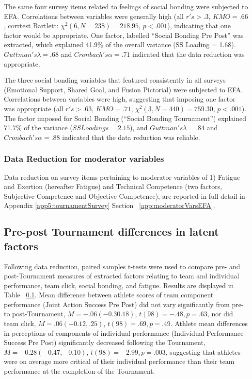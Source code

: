 The same four survey items related to feelings of social bonding were subjected to EFA. Correlations between variables were generally high (all $r's > .3$, $KMO = .66$, corrtest Bartlett: $\chi^2(6, N = 238) = 218.95$, $p < .001$), indicating that one factor would be appropriate.  One factor, labelled ``Social Bonding Pre Post'' was extracted, which explained 41.9\% of the overall variance (SS Loading = 1.68).  $Guttman's \lambda =.68$ and $Cronbach's \alpha = .71$ indicated that the data reduction was appropriate.

The three social bonding variables that featured consistently in all surveys (Emotional Support, Shared Goal, and Fusion Pictorial) were subjected to EFA. Correlations between variables were high, suggesting that imposing one factor was appropriate (all $r's > .63$, $KMO = .71$, $\chi^2(3, N = 440) =  759.30$, $p < .001$).  The factor imposed for Social Bonding (``Social Bonding Tournament'') explained 71.7\% of the variance ($SS Loadings =  2.15$), and $Guttman's \lambda =.84$ and $Cronbach's \alpha= .88$ indicated that the data reduction was reliable.

\subsubsection{Data Reduction for moderator variables}
Data reduction on survey items pertaining to moderator variables of 1) Fatigue and Exertion (hereafter Fatigue) and Technical Competence (two factors, Subjective Competence and Objective Competence), are reported in full detail in Appendix \ref{app5:tournamentSurvey} Section ~\ref{app:moderatorVarsEFA}.



 \subsection{Pre-post Tournament differences in latent factors}
 Following data reduction, paired samples t-tests were used to compare pre- and post-Tournament measures of extracted factors relating to team and individual performance, team click, social bonding, and fatigue. Results are displayed in Table ~\ref{}.  Mean difference between athlete scores of team component performance (Joint Action Success Pre Post) did not vary significantly from pre- to post-Tournament, $M = -.06 (-0.30  .18)$, $t(98)= -.48, p = .63$, nor did team click, $M = .06 (-0.12, .25)$, $t(98)= .69, p = .49$. Athlete mean differences in perceptions of components of individual performance (Individual Performance Success Pre Post) significantly decreased following the Tournament, $M = -0.28 (-0.47, -0.10)$, $t(98)= -2.99, p = .003$, suggesting that athletes were on average more critical of their individual performance than their team performance at the completion of the Tournament.

